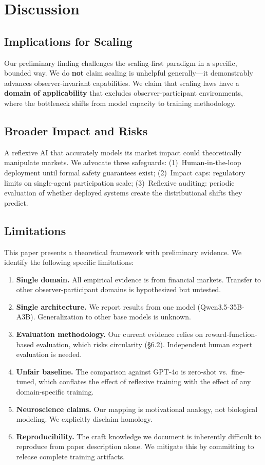 \documentclass[11pt,a4paper]{article}
\begin{document}
\section{Discussion}

\subsection{Implications for Scaling}
Our preliminary finding challenges the scaling-first paradigm in a specific, bounded way. We do \textbf{not} claim scaling is unhelpful generally---it demonstrably advances observer-invariant capabilities. We claim that scaling laws have a \textbf{domain of applicability} that excludes observer-participant environments, where the bottleneck shifts from model capacity to training methodology.

\subsection{Broader Impact and Risks}
A reflexive AI that accurately models its market impact could theoretically manipulate markets. We advocate three safeguards: (1)~Human-in-the-loop deployment until formal safety guarantees exist; (2)~Impact caps: regulatory limits on single-agent participation scale; (3)~Reflexive auditing: periodic evaluation of whether deployed systems create the distributional shifts they predict.

\subsection{Limitations}
This paper presents a theoretical framework with preliminary evidence. We identify the following specific limitations:

\begin{enumerate}[leftmargin=*]
\item \textbf{Single domain.} All empirical evidence is from financial markets. Transfer to other observer-participant domains is hypothesized but untested.
\item \textbf{Single architecture.} We report results from one model (Qwen3.5-35B-A3B). Generalization to other base models is unknown.
\item \textbf{Evaluation methodology.} Our current evidence relies on reward-function-based evaluation, which risks circularity (\S6.2). Independent human expert evaluation is needed.
\item \textbf{Unfair baseline.} The comparison against GPT-4o is zero-shot vs.\ fine-tuned, which conflates the effect of reflexive training with the effect of any domain-specific training.
\item \textbf{Neuroscience claims.} Our mapping is motivational analogy, not biological modeling. We explicitly disclaim homology.
\item \textbf{Reproducibility.} The craft knowledge we document is inherently difficult to reproduce from paper description alone. We mitigate this by committing to release complete training artifacts.
\end{enumerate}
\end{document}
